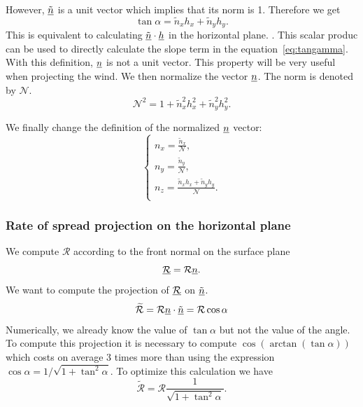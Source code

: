 However, $\underline{\tilde n}$ is a unit vector which implies that its norm is 1. Therefore we get 
\begin{equation}
  \tan \alpha = \tilde n_x h_x + \tilde n_y h_y.
  \label{eq:alphadef}
\end{equation}
This is equivalent to calculating $\underline{\tilde n} \cdot \underline{h} $ in the horizontal plane. . This scalar produc can be used to directly calculate the slope term in the equation~\eqref{eq:tangamma}. 
With this definition, $\underline{n}$ is not a unit vector. This property will be very useful when projecting the wind. We then normalize the vector $\underline{n}$. The norm is denoted by $\mathcal N$.
\begin{equation}
  \mathcal N^2 = 1 + \tilde n_x^2 h_x^2 + \tilde n_y^2 h_y^2.
\end{equation}

We finally change the definition of the normalized $\underline{n}$ vector:
\begin{equation}
  \begin{cases}
  	n_x = \frac{\tilde n_x}{\mathcal N}, \\
  	n_y = \frac{\tilde n_y}{\mathcal N}, \\
  	n_z = \frac{\tilde n_x h_x + \tilde n_y h_y}{\mathcal N}. \\
  \end{cases}
\end{equation}

\subsubsection{Rate of spread projection on the horizontal plane}

We compute $\mathcal R$ according to the front normal on the surface plane
\begin{equation}
  \underline{\mathcal R} = \mathcal R \underline{n}.
\end{equation}
We want to compute the projection of $\underline{\mathcal R}$ on $\underline{\tilde n}$.
\begin{equation}
  \widetilde{\mathcal R} = \mathcal R \underline{n} \cdot \underline{\tilde n} = \mathcal R \cos \alpha
\end{equation}
Numerically, we already know the value of $\tan \alpha$ but not the value of the angle. To compute this projection it is necessary to compute $\cos (\arctan (\tan \alpha))$ which costs on average 3 times more than using the expression $\cos \alpha = 1 /\sqrt{1 + \tan^2 \alpha}$.
To optimize this calculation we have
\begin{equation}
  \widetilde{\mathcal R} = \mathcal R \frac{1}{\sqrt{1 + \tan^2 \alpha}}.
\end{equation}

